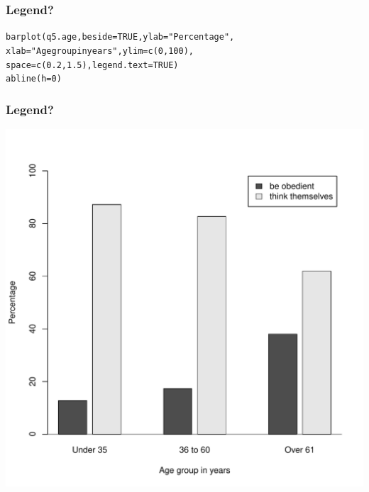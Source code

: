 \documentclass{beamer}\usepackage[]{graphicx}\usepackage[]{color}
\makeatletter
\newcommand{\hlnum}[1]{\textcolor[rgb]{0.533,0,0.133}{#1}}%
\newcommand{\hlstr}[1]{\textcolor[rgb]{0.667,0.267,0}{#1}}%
\newcommand{\hlstd}[1]{\textcolor[rgb]{0,0,0}{#1}}%
\newcommand{\hlkwc}[1]{\textcolor[rgb]{0,0,0.4}{#1}}%
\newcommand{\hlkwd}[1]{\textcolor[rgb]{0,0.267,0.4}{#1}}%
\newenvironment{kframe}{%
 \def\at@end@of@kframe{}%
 \ifinner\ifhmode%
  \def\at@end@of@kframe{\end{minipage}}%
  \begin{minipage}{\columnwidth}%
 \fi\fi%
 \def\FrameCommand##1{\hskip\@totalleftmargin \hskip-\fboxsep
 \colorbox{shadecolor}{##1}\hskip-\fboxsep
     \hskip-\linewidth \hskip-\@totalleftmargin \hskip\columnwidth}%
 \MakeFramed {\advance\hsize-\width
   \@totalleftmargin\z@ \linewidth\hsize
   \@setminipage}}%
 {\par\unskip\endMakeFramed%
 \at@end@of@kframe}
\newenvironment{knitrout}{}{} %
\makeatother
\begin{document}
\begin{frame}[fragile]
  \frametitle{Legend?}
\begin{knitrout}
\color{fgcolor}\begin{kframe}
\begin{alltt}
\hlkwd{barplot}\hlstd{(q5.age,} \hlkwc{beside} \hlstd{=} \hlnum{TRUE}\hlstd{,} \hlkwc{ylab} \hlstd{=} \hlstr{"Percentage"}\hlstd{,}
        \hlkwc{xlab} \hlstd{=} \hlstr{"Age group in years"}\hlstd{,} \hlkwc{ylim} \hlstd{=} \hlkwd{c}\hlstd{(}\hlnum{0}\hlstd{,} \hlnum{100}\hlstd{),}
        \hlkwc{space} \hlstd{=} \hlkwd{c}\hlstd{(}\hlnum{0.2}\hlstd{,} \hlnum{1.5}\hlstd{),} \hlkwc{legend.text} \hlstd{=} \hlnum{TRUE}\hlstd{)}
\hlkwd{abline}\hlstd{(}\hlkwc{h} \hlstd{=} \hlnum{0}\hlstd{)}
\end{alltt}
\end{kframe}
\end{knitrout}
\end{frame}

\begin{frame}[fragile]
  \frametitle{Legend?}
\begin{knitrout}
\color{fgcolor}

{\centering \includegraphics[width=0.6\linewidth]{figure/bar7-1} 

}



\end{knitrout}
\end{frame}
 
\end{document}
